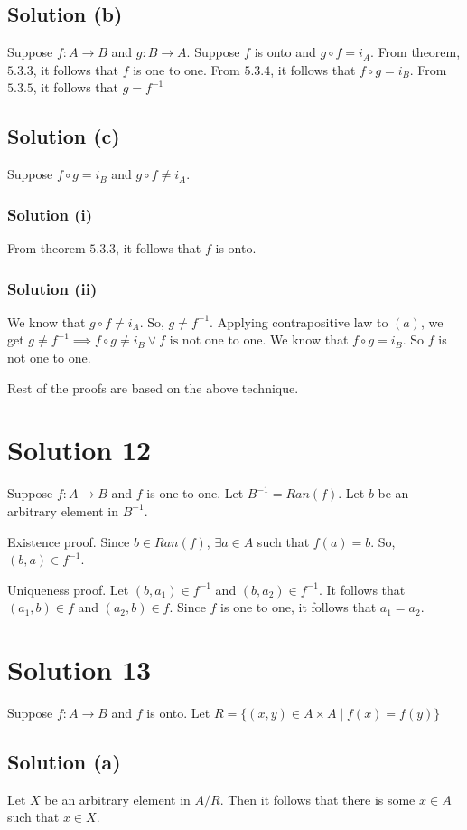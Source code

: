 \documentclass{article}
\begin{document}
\subsection{Solution (b)}
Suppose $f:A \to B$ and $g:B \to A$. Suppose $f$ is onto and $g \circ
f = i_A$. From theorem, $5.3.3$, it follows that $f$ is one to one.
From $5.3.4$, it follows that $f \circ g = i_B$. From $5.3.5$, it
follows that $g = f^{-1}$

\subsection{Solution (c)}
Suppose $f \circ g = i_B$ and $g \circ f \neq i_A$.

\subsubsection{Solution (i)}
From theorem $5.3.3$, it follows that $f$ is onto.

\subsubsection{Solution (ii)}
We know that $g \circ f \neq i_A$. So, $g \neq f^{-1}$. Applying
contrapositive law to $(a)$, we get $g \neq f^{-1} \implies f \circ g
\neq i_B \lor f \text{ is not one to one}$. We know that $f \circ g =
i_B$. So $f$ is not one to one.

Rest of the proofs are based on the above technique.

\section{Solution 12}
Suppose $f:A \to B$ and $f$ is one to one. Let $B^{-1} = Ran(f)$. Let
$b$ be an arbitrary element in $B^{-1}$.

Existence proof. Since $b \in Ran(f)$, $\exists a \in A$ such that
$f(a) = b$. So, $(b,a) \in f^{-1}$.

Uniqueness proof. Let $(b,a_1) \in f^{-1}$ and $(b,a_2) \in f^{-1}$.
It follows that $(a_1, b) \in f$ and $(a_2, b) \in f$. Since $f$ is
one to one, it follows that $a_1 = a_2$.

\section{Solution 13}
Suppose $f: A \to B$ and $f$ is onto. Let $R = \{(x,y) \in A \times A
\mid f(x) = f(y) \}$

\subsection{Solution (a)}
Let $X$ be an arbitrary element in $A/R$. Then it follows that there
is some $x \in A$ such that $x \in X$.
\end{document}

